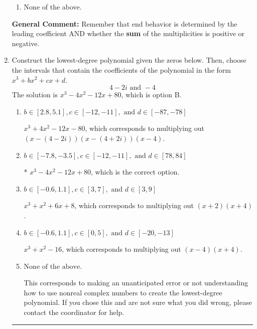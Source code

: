\documentclass{extbook}[14pt]
\newcommand{\litem}[1]{\item #1

\rule{\textwidth}{0.4pt}}
\begin{document}
\begin{enumerate}
{\begin{enumerate}[label=\Alph*.]
\item None of the above.\end{enumerate}
\textbf{General Comment:} Remember that end behavior is determined by the leading coefficient AND whether the \textbf{sum} of the multiplicities is positive or negative.
}
\litem{
Construct the lowest-degree polynomial given the zeros below. Then, choose the intervals that contain the coefficients of the polynomial in the form $x^3+bx^2+cx+d$.
\[ 4 - 2 i \text{ and } -4 \]The solution is \( x^{3} -4 x^{2} -12 x + 80 \), which is option B.\begin{enumerate}[label=\Alph*.]
\item \( b \in [2.8, 5.1], c \in [-12, -11], \text{ and } d \in [-87, -78] \)

$x^{3} +4 x^{2} -12 x -80$, which corresponds to multiplying out $(x-(4 - 2 i))(x-(4 + 2 i))(x -4)$.
\item \( b \in [-7.8, -3.5], c \in [-12, -11], \text{ and } d \in [78, 84] \)

* $x^{3} -4 x^{2} -12 x + 80$, which is the correct option.
\item \( b \in [-0.6, 1.1], c \in [3, 7], \text{ and } d \in [3, 9] \)

$x^{3} + x^{2} +6 x + 8$, which corresponds to multiplying out $(x + 2)(x + 4)$.
\item \( b \in [-0.6, 1.1], c \in [0, 5], \text{ and } d \in [-20, -13] \)

$x^{3} + x^{2} -16$, which corresponds to multiplying out $(x -4)(x + 4)$.
\item \( \text{None of the above.} \)

This corresponds to making an unanticipated error or not understanding how to use nonreal complex numbers to create the lowest-degree polynomial. If you chose this and are not sure what you did wrong, please contact the coordinator for help.
\end{enumerate}

}
\end{enumerate}
\end{document}
